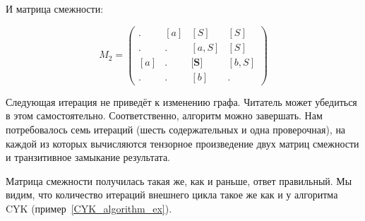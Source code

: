 \begin{example}
И матрица смежности:

$$ M_2 =
\begin{pmatrix}
. & [a] & [S] & [S] \\
. & . & [a, S] & [S] \\
[a] & . & \textbf{[S]} & [b,S] \\
. & . & [b] & .
\end{pmatrix}
$$


Следующая итерация не приведёт к изменению графа.
Читатель может убедиться в этом самостоятельно.
Соответственно, алгоритм можно завершать.
Нам потребовалось семь итераций (шесть содержательных и одна проверочная), на каждой из которых вычисляются тензорное произведение двух матриц смежности и транзитивное замыкание результата.

Матрица смежности получилась такая же, как и раньше, ответ правильный.
Мы видим, что количество итераций внешнего цикла такое же как и у алгоритма CYK (пример~\ref{CYK_algorithm_ex}).

\end{example}


